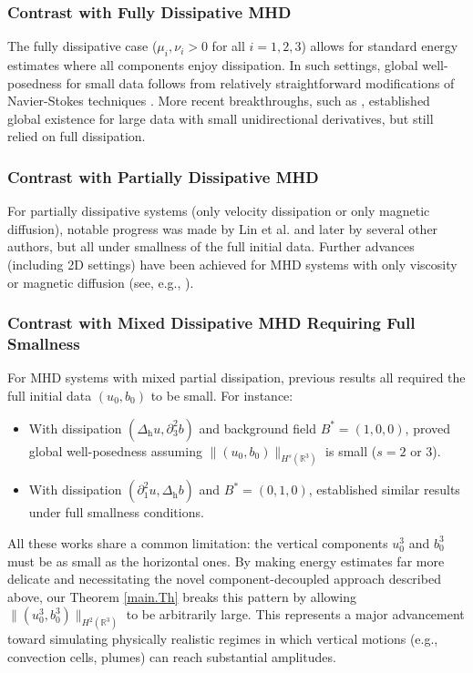 \documentclass[11pt]{amsart}
\theoremstyle{definition}
\newcommand{\R}{\mathbb{R}}
\numberwithin{equation}{section}
\begin{document}
\subsubsection{Contrast with Fully Dissipative MHD}
The fully dissipative case ($\mu_i,\nu_i>0$ for all $i=1,2,3$) allows for standard energy estimates where all components enjoy dissipation. In such settings, global well-posedness for small data follows from relatively straightforward modifications of Navier-Stokes techniques \cite{72lions,83sermange}. More recent breakthroughs, such as \cite{2023Nacer}, established global existence for large data with small unidirectional derivatives, but still relied on full dissipation.
\subsubsection{Contrast with Partially Dissipative MHD}
For partially dissipative systems (only velocity dissipation or only magnetic diffusion), notable progress was made by Lin et al. \cite{15Lin} and later by several other authors, but all under smallness of the full initial data. Further advances (including 2D settings) have been achieved for MHD systems with only viscosity or magnetic diffusion (see, e.g., \cite{2017abidi,2018cai,18he,19jiang,15Lin2,18pan,14Ren,18tan,17wei,15wu,15Xu,18zhou}).


\subsubsection{Contrast with Mixed Dissipative MHD Requiring Full Smallness}
For MHD systems with mixed partial dissipation, previous results all required the full initial data $(u_0,b_0)$ to be small. For instance:
\begin{itemize}
	\item With dissipation $(\Delta_\mathrm{h}u,\partial_3^2b)$ and background field $B^*=(1,0,0)$, \cite{24han,21wu} proved global well-posedness assuming $\|(u_0,b_0)\|_{H^s(\R^3)}$ is small ($s=2$ or $3$).
	\item With dissipation $(\partial_1^2u,\Delta_\mathrm{h}b)$ and $B^*=(0,1,0)$, \cite{23Lin,25Lin,26wu} established similar results under full smallness conditions.
\end{itemize}
All these works share a common limitation: the vertical components $u^3_0$ and $b^3_0$ must be as small as the horizontal ones. By making energy estimates far more delicate and necessitating the novel component-decoupled approach described above, our Theorem \ref{main.Th} breaks this pattern by allowing $\|(u^3_0,b^3_0)\|_{H^2(\R^3)}$ to be arbitrarily large. This represents a major advancement toward simulating physically realistic regimes in which vertical motions (e.g., convection cells, plumes) can reach substantial amplitudes.
\end{document}

